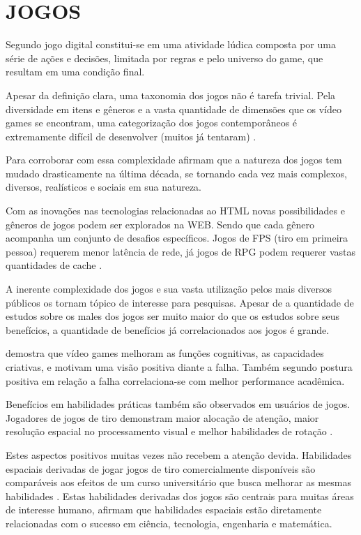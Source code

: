 \section{JOGOS}

Segundo \autocite{indieGamesLemes} jogo digital constitui-se em uma
atividade lúdica composta por uma série de ações e decisões,
limitada por regras e pelo universo do game, que resultam em uma
condição final.

Apesar da definição clara, uma taxonomia dos jogos não é tarefa
trivial. Pela diversidade em itens e gêneros e a vasta quantidade de
dimensões que os vídeo games se encontram, uma categorização dos
jogos contemporâneos é extremamente difícil de desenvolver (muitos
já tentaram) \autocite[pp. 60]{gamebenefits}.

Para corroborar com essa complexidade \cite{gamebenefits} afirmam que
a natureza dos jogos tem mudado drasticamente na última década, se
tornando cada vez mais complexos, diversos, realísticos e sociais em
sua natureza.

Com as inovações nas tecnologias relacionadas ao HTML novas
possibilidades e gêneros de jogos podem ser explorados na WEB. Sendo
que cada gênero acompanha um conjunto de desafios específicos.
Jogos de FPS (tiro em primeira pessoa) requerem menor latência de
rede, já jogos de RPG podem requerer vastas quantidades de cache
\autocite{html5mostwanted}.

A inerente complexidade dos jogos e sua vasta utilização pelos mais
diversos públicos os tornam tópico de interesse para pesquisas.
Apesar de a quantidade de estudos sobre os males dos jogos ser
muito maior do que os estudos sobre seus benefícios, a quantidade de
benefícios já correlacionados aos jogos é grande.

\autocite{gamebenefits} demostra que vídeo games melhoram as funções
cognitivas, as capacidades criativas, e motivam uma visão positiva
diante a falha. Também segundo \autocite{gamebenefits} postura positiva
em relação a falha correlaciona-se com melhor performance acadêmica.

Benefícios em habilidades práticas também são observados em
usuários de jogos. Jogadores de jogos de tiro demonstram maior
alocação de atenção, maior resolução espacial no processamento
visual e melhor habilidades de rotação \autocite{gamebenefits}.

Estes aspectos positivos muitas vezes não recebem a atenção devida.
Habilidades espaciais derivadas de jogar jogos de tiro comercialmente
disponíveis são comparáveis aos efeitos de um curso universitário
que busca melhorar as mesmas habilidades \autocite{gamebenefits}. Estas
habilidades derivadas dos jogos são centrais para muitas áreas de
interesse humano, \cite{gamebenefits} afirmam que habilidades espaciais
estão diretamente relacionadas com o sucesso em ciência, tecnologia,
engenharia e matemática.

